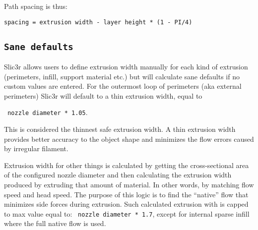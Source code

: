 Path spacing is thus:
\par \verb|spacing = extrusion width - layer height * (1 - PI/4)|

\subsection{\texttt{Sane defaults}}
\label{sec:sane_defaults}

Slic3r allows users to define extrusion width manually for each kind of extrusion (perimeters, infill, support material etc.) but will calculate sane defaults if no custom values are entered.
For the outermost loop of perimeters (aka external perimeters) Slic3r will default to a thin extrusion width, equal to
\par \verb| nozzle diameter * 1.05|.

This is considered the thinnest safe extrusion width. A thin extrusion width provides better accuracy to the object shape and minimizes the flow errors caused by irregular filament.

Extrusion width for other things is calculated by getting the cross-sectional area of the configured nozzle diameter and then calculating the extrusion width produced by extruding that amount of material. In other words, by matching flow speed and head speed. The purpose of this logic is to find the ``native'' flow that minimizes side forces during extrusion. Such calculated extrusion with is capped to max value equal to:
\verb| nozzle diameter * 1.7|, except for internal sparse infill where the full native flow is used.
